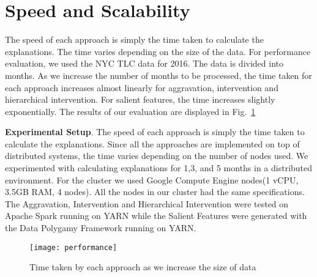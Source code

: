 




\section{Speed and Scalability}
\label{sec:speed}
The speed of each approach is simply the time taken to calculate the explanations. The time varies depending on the size of the data. For performance evaluation, we used the NYC TLC data for 2016. The data is divided into months. As we increase the number of months to be processed, the time taken for each approach increases almost linearly for aggravation, intervention and hierarchical intervention. For salient features, the time increases slightly exponentially. The results of our evaluation are displayed in Fig.~\ref{fig:performance}

\textbf{Experimental Setup}. The speed of each approach is simply the time taken to calculate the explanations. Since all the approaches are implemented on top of distributed systems, the time varies depending on the number of nodes used. We experimented with calculating explanations for 1,3, and 5 months in a distributed environment. For the cluster we used Google Compute Engine nodes(1 vCPU, 3.5GB RAM, 4 nodes). All the nodes in our cluster had the same specifications. The Aggravation, Intervention and Hierarchical Intervention were tested on Apache Spark running on YARN while the Salient Features were generated with the Data Polygamy Framework running on YARN.
\begin{figure}[h]
\texttt{[image: performance]}
\caption{Time taken by each approach as we increase the size of data}
\label{fig:performance}
\end{figure}

